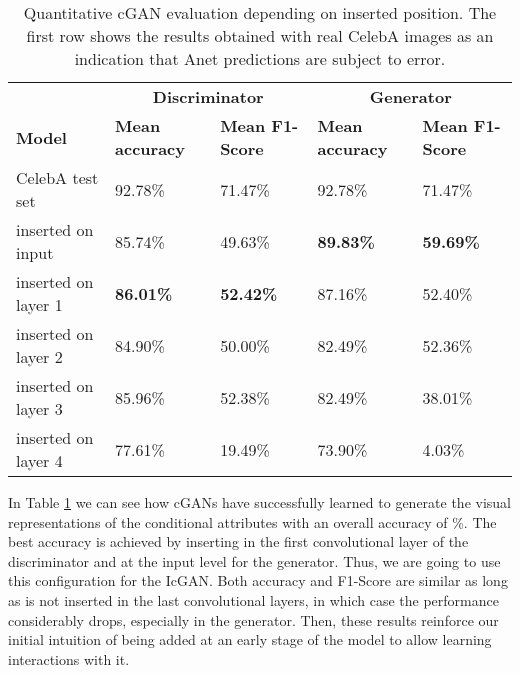 \documentclass{article}
\begin{document}
\begin{table}[ht]
\centering
\caption{Quantitative cGAN evaluation depending on  inserted position. The first row shows the results obtained with real CelebA images as an indication that Anet predictions are subject to error.}
\label{tab:cGAN_quantEval}
\begin{adjustbox}{width=0.80\textwidth}
\begin{tabular}{lllll}
                        & \multicolumn{2}{c}{\textbf{Discriminator}}                           & \multicolumn{2}{c}{\textbf{Generator}}          \\
\textbf{Model}          & \textbf{Mean accuracy} & \multicolumn{1}{l|}{\textbf{Mean F1-Score}} & \textbf{Mean accuracy} & \textbf{Mean F1-Score} \\
CelebA test set         & 92.78\%                & \multicolumn{1}{l|}{71.47\%}                & 92.78\%                & 71.47\%                \\
 inserted on input            & 85.74\%                & \multicolumn{1}{l|}{49.63\%}                & \textbf{89.83\%}       & \textbf{59.69\%}       \\
 inserted on layer 1 & \textbf{86.01\%}       & \multicolumn{1}{l|}{\textbf{52.42\%}}       & 87.16\%                & 52.40\%                \\
 inserted on layer 2 & 84.90\%                & \multicolumn{1}{l|}{50.00\%}                & 82.49\%                & 52.36\%                \\
 inserted on layer 3 & 85.96\%                & \multicolumn{1}{l|}{52.38\%}                & 82.49\%                & 38.01\%                \\
 inserted on layer 4 & 77.61\%                & \multicolumn{1}{l|}{19.49\%}                & 73.90\%                & 4.03\%                
\end{tabular}
\end{adjustbox}
\end{table}

In Table \ref{tab:cGAN_quantEval} we can see how cGANs have successfully learned to generate the visual representations of the conditional attributes with an overall accuracy of \%. The best accuracy is achieved by inserting  in the first convolutional layer of the discriminator and at the input level for the generator. Thus, we are going to use this configuration for the IcGAN. Both accuracy and F1-Score are similar as long as  is not inserted in the last convolutional layers, in which case the performance considerably drops, especially in the generator. Then, these results reinforce our initial intuition of  being added at an early stage of the model to allow learning interactions with it.
\end{document}
